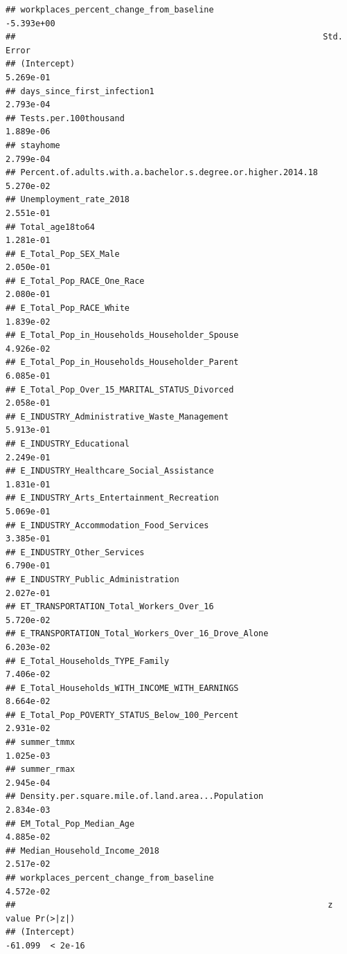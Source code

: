 \documentclass[
]{article}
\begin{document}
\begin{verbatim}
## workplaces_percent_change_from_baseline                      -5.393e+00
##                                                              Std. Error
## (Intercept)                                                   5.269e-01
## days_since_first_infection1                                   2.793e-04
## Tests.per.100thousand                                         1.889e-06
## stayhome                                                      2.799e-04
## Percent.of.adults.with.a.bachelor.s.degree.or.higher.2014.18  5.270e-02
## Unemployment_rate_2018                                        2.551e-01
## Total_age18to64                                               1.281e-01
## E_Total_Pop_SEX_Male                                          2.050e-01
## E_Total_Pop_RACE_One_Race                                     2.080e-01
## E_Total_Pop_RACE_White                                        1.839e-02
## E_Total_Pop_in_Households_Householder_Spouse                  4.926e-02
## E_Total_Pop_in_Households_Householder_Parent                  6.085e-01
## E_Total_Pop_Over_15_MARITAL_STATUS_Divorced                   2.058e-01
## E_INDUSTRY_Administrative_Waste_Management                    5.913e-01
## E_INDUSTRY_Educational                                        2.249e-01
## E_INDUSTRY_Healthcare_Social_Assistance                       1.831e-01
## E_INDUSTRY_Arts_Entertainment_Recreation                      5.069e-01
## E_INDUSTRY_Accommodation_Food_Services                        3.385e-01
## E_INDUSTRY_Other_Services                                     6.790e-01
## E_INDUSTRY_Public_Administration                              2.027e-01
## ET_TRANSPORTATION_Total_Workers_Over_16                       5.720e-02
## E_TRANSPORTATION_Total_Workers_Over_16_Drove_Alone            6.203e-02
## E_Total_Households_TYPE_Family                                7.406e-02
## E_Total_Households_WITH_INCOME_WITH_EARNINGS                  8.664e-02
## E_Total_Pop_POVERTY_STATUS_Below_100_Percent                  2.931e-02
## summer_tmmx                                                   1.025e-03
## summer_rmax                                                   2.945e-04
## Density.per.square.mile.of.land.area...Population             2.834e-03
## EM_Total_Pop_Median_Age                                       4.885e-02
## Median_Household_Income_2018                                  2.517e-02
## workplaces_percent_change_from_baseline                       4.572e-02
##                                                               z value Pr(>|z|)
## (Intercept)                                                   -61.099  < 2e-16

\end{verbatim}
\end{document}
